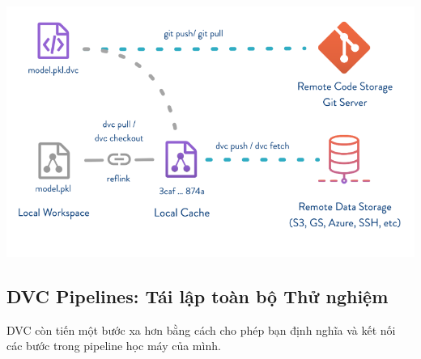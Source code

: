 \begin{center}
    \includegraphics[width=1.0\textwidth]{images/dvc_workflowpng.png}
    \label{fig:dvc_workflow}
\end{center}

\subsection{DVC Pipelines: Tái lập toàn bộ Thử nghiệm}
\label{ssec:dvc_pipelines}
DVC còn tiến một bước xa hơn bằng cách cho phép bạn định nghĩa và kết nối các bước trong pipeline học máy của mình.

